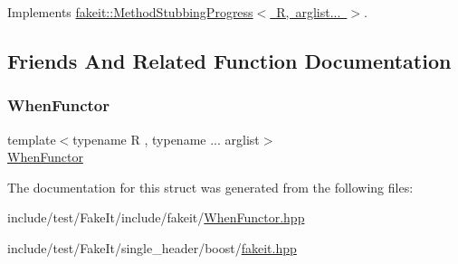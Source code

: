 Implements \mbox{\hyperlink{structfakeit_1_1MethodStubbingProgress_a73218fd396f0096f93462f2d4656c509}{fakeit\+::\+Method\+Stubbing\+Progress$<$ R, arglist... $>$}}.



\subsection{Friends And Related Function Documentation}
\mbox{\label{structfakeit_1_1WhenFunctor_1_1MethodProgress_ae041ecdb9ca5786188a1b551a25cefd5}} 
\subsubsection{\texorpdfstring{WhenFunctor}{WhenFunctor}}
{\footnotesize\ttfamily template$<$typename R , typename ... arglist$>$ \\
\mbox{\hyperlink{classfakeit_1_1WhenFunctor}{When\+Functor}}\hspace{0.3cm}{\ttfamily [friend]}}



The documentation for this struct was generated from the following files\+:\begin{DoxyCompactItemize}
\item 
include/test/\+Fake\+It/include/fakeit/\mbox{\hyperlink{WhenFunctor_8hpp}{When\+Functor.\+hpp}}\item 
include/test/\+Fake\+It/single\+\_\+header/boost/\mbox{\hyperlink{single__header_2boost_2fakeit_8hpp}{fakeit.\+hpp}}\end{DoxyCompactItemize}
